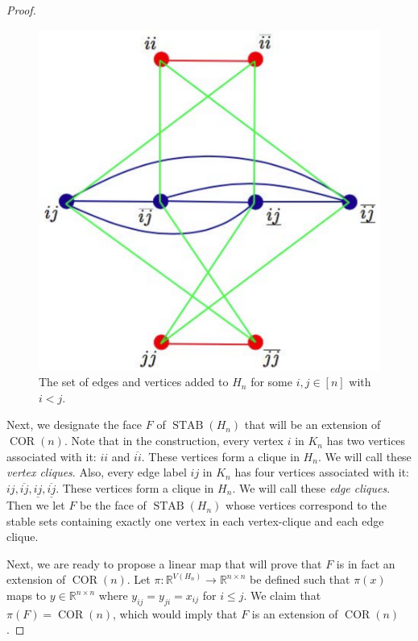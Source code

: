 \documentclass{article}
\theoremstyle{definition}
\theoremstyle{remark}
\newcommand{\ol}[1]{\overline{#1}}
\newcommand{\ul}[1]{\underline{#1}}
\newcommand{\oul}[1]{\overline{\underline{#1}}}
\newcommand{\STAB}{\operatorname{STAB}}
\newcommand{\COR}{\operatorname{COR}}
\renewcommand{\R}{\mathbb{R}}
\begin{document}
\begin{proof}
\begin{figure}
\centering
\includegraphics[scale=0.4]{stable.pdf}
\caption{The set of edges and vertices added to $H_n$ for some $i,j \in [n]$ with $i < j$.}
\label{fig:stab-construct}
\end{figure}

Next, we designate the face $F$ of $\STAB(H_n)$ that will be an extension of $\COR(n)$. Note that in the construction, every vertex $i$ in $K_n$ has two vertices associated with it: $ii$ and $\ol{ii}$. These vertices form a clique in $H_n$. We will call these \emph{vertex cliques}. Also, every edge label $ij$ in $K_n$ has four vertices associated with it: $ij, \ol{ij}, \ul{ij}, \oul{ij}$. These vertices form a clique in $H_n$. We will call these \emph{edge cliques}. Then we let $F$ be the face of $\STAB(H_n)$ whose vertices correspond to the stable sets containing exactly one vertex in each vertex-clique and each edge clique. 

Next, we are ready to propose a linear map that will prove that $F$ is in fact an extension of $\COR(n)$. Let $\pi : \R^{V(H_n)} \to \R^{n\times n}$ be defined such that $\pi(x)$ maps to $y \in \R^{n \times n}$ where $y_{ij} = y_{ji} = x_{ij}$ for $i \le j$. We claim that $\pi(F) = \COR(n)$, which would imply that $F$ is an extension of $\COR(n)$.


\end{proof}
\end{document}
